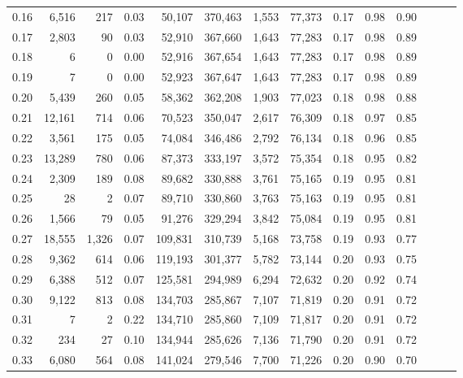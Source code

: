 \begin{tabular}{rrrrrrrrrrrrrr}
0.16 &   6,516 &    217 &  0.03 &   50,107 &  370,463 &   1,553 &  77,373 &  0.17 &  0.98 &      0.90 \\
0.17 &   2,803 &     90 &  0.03 &   52,910 &  367,660 &   1,643 &  77,283 &  0.17 &  0.98 &      0.89 \\
0.18 &       6 &      0 &  0.00 &   52,916 &  367,654 &   1,643 &  77,283 &  0.17 &  0.98 &      0.89 \\
0.19 &       7 &      0 &  0.00 &   52,923 &  367,647 &   1,643 &  77,283 &  0.17 &  0.98 &      0.89 \\
0.20 &   5,439 &    260 &  0.05 &   58,362 &  362,208 &   1,903 &  77,023 &  0.18 &  0.98 &      0.88 \\
0.21 &  12,161 &    714 &  0.06 &   70,523 &  350,047 &   2,617 &  76,309 &  0.18 &  0.97 &      0.85 \\
0.22 &   3,561 &    175 &  0.05 &   74,084 &  346,486 &   2,792 &  76,134 &  0.18 &  0.96 &      0.85 \\
0.23 &  13,289 &    780 &  0.06 &   87,373 &  333,197 &   3,572 &  75,354 &  0.18 &  0.95 &      0.82 \\
0.24 &   2,309 &    189 &  0.08 &   89,682 &  330,888 &   3,761 &  75,165 &  0.19 &  0.95 &      0.81 \\
0.25 &      28 &      2 &  0.07 &   89,710 &  330,860 &   3,763 &  75,163 &  0.19 &  0.95 &      0.81 \\
0.26 &   1,566 &     79 &  0.05 &   91,276 &  329,294 &   3,842 &  75,084 &  0.19 &  0.95 &      0.81 \\
0.27 &  18,555 &  1,326 &  0.07 &  109,831 &  310,739 &   5,168 &  73,758 &  0.19 &  0.93 &      0.77 \\
0.28 &   9,362 &    614 &  0.06 &  119,193 &  301,377 &   5,782 &  73,144 &  0.20 &  0.93 &      0.75 \\
0.29 &   6,388 &    512 &  0.07 &  125,581 &  294,989 &   6,294 &  72,632 &  0.20 &  0.92 &      0.74 \\
0.30 &   9,122 &    813 &  0.08 &  134,703 &  285,867 &   7,107 &  71,819 &  0.20 &  0.91 &      0.72 \\
0.31 &       7 &      2 &  0.22 &  134,710 &  285,860 &   7,109 &  71,817 &  0.20 &  0.91 &      0.72 \\
0.32 &     234 &     27 &  0.10 &  134,944 &  285,626 &   7,136 &  71,790 &  0.20 &  0.91 &      0.72 \\
0.33 &   6,080 &    564 &  0.08 &  141,024 &  279,546 &   7,700 &  71,226 &  0.20 &  0.90 &      0.70 \\

\end{tabular}
